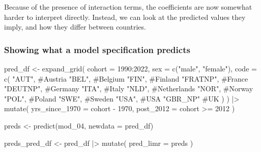 \documentclass[
  letterpaper,
  DIV=11,
  numbers=noendperiod]{scrartcl}
\newenvironment{Shaded}{\begin{snugshade}}{\end{snugshade}}
\newcommand{\AttributeTok}[1]{\textcolor[rgb]{0.40,0.45,0.13}{#1}}
\newcommand{\CommentTok}[1]{\textcolor[rgb]{0.37,0.37,0.37}{#1}}
\newcommand{\DecValTok}[1]{\textcolor[rgb]{0.68,0.00,0.00}{#1}}
\newcommand{\FunctionTok}[1]{\textcolor[rgb]{0.28,0.35,0.67}{#1}}
\newcommand{\NormalTok}[1]{\textcolor[rgb]{0.00,0.23,0.31}{#1}}
\newcommand{\OtherTok}[1]{\textcolor[rgb]{0.00,0.23,0.31}{#1}}
\newcommand{\SpecialCharTok}[1]{\textcolor[rgb]{0.37,0.37,0.37}{#1}}
\newcommand{\StringTok}[1]{\textcolor[rgb]{0.13,0.47,0.30}{#1}}
\begin{document}
Because of the presence of interaction terms, the coefficients are now
somewhat harder to interpret directly. Instead, we can look at the
predicted values they imply, and how they differ between countries.

\hypertarget{showing-what-a-model-specification-predicts}{%
\subsubsection{Showing what a model specification
predicts}\label{showing-what-a-model-specification-predicts}}

\begin{Shaded}
\begin{Highlighting}[]
\NormalTok{pred\_df }\OtherTok{\textless{}{-}} 
  \FunctionTok{expand\_grid}\NormalTok{(}
    \AttributeTok{cohort =} \DecValTok{1990}\SpecialCharTok{:}\DecValTok{2022}\NormalTok{, }
    \AttributeTok{sex =} \FunctionTok{c}\NormalTok{(}\StringTok{"male"}\NormalTok{, }\StringTok{"female"}\NormalTok{),}
    \AttributeTok{code =} \FunctionTok{c}\NormalTok{(}
    \StringTok{"AUT"}\NormalTok{, }\CommentTok{\#Austria}
    \StringTok{"BEL"}\NormalTok{, }\CommentTok{\#Belgium}
    \StringTok{"FIN"}\NormalTok{, }\CommentTok{\#Finland}
    \StringTok{"FRATNP"}\NormalTok{, }\CommentTok{\#France}
    \StringTok{"DEUTNP"}\NormalTok{, }\CommentTok{\#Germany}
    \StringTok{"ITA"}\NormalTok{, }\CommentTok{\#Italy}
    \StringTok{"NLD"}\NormalTok{, }\CommentTok{\#Netherlands}
    \StringTok{"NOR"}\NormalTok{, }\CommentTok{\#Norway}
    \StringTok{"POL"}\NormalTok{, }\CommentTok{\#Poland}
    \StringTok{"SWE"}\NormalTok{, }\CommentTok{\#Sweden}
    \StringTok{"USA"}\NormalTok{, }\CommentTok{\#USA}
    \StringTok{"GBR\_NP"} \CommentTok{\#UK}
\NormalTok{    )}
\NormalTok{  )  }\SpecialCharTok{|\textgreater{}} 
  \FunctionTok{mutate}\NormalTok{(}
    \AttributeTok{yrs\_since\_1970 =}\NormalTok{ cohort }\SpecialCharTok{{-}} \DecValTok{1970}\NormalTok{,}
    \AttributeTok{post\_2012 =}\NormalTok{ cohort }\SpecialCharTok{\textgreater{}=} \DecValTok{2012}
\NormalTok{  )}

\NormalTok{preds }\OtherTok{\textless{}{-}} \FunctionTok{predict}\NormalTok{(mod\_04, }\AttributeTok{newdata =}\NormalTok{ pred\_df)}

\NormalTok{preds\_pred\_df }\OtherTok{\textless{}{-}} 
\NormalTok{  pred\_df }\SpecialCharTok{|\textgreater{}} 
  \FunctionTok{mutate}\NormalTok{(}
    \AttributeTok{pred\_limr =}\NormalTok{ preds}
\NormalTok{  )}
\end{Highlighting}
\end{Shaded}
\end{document}
